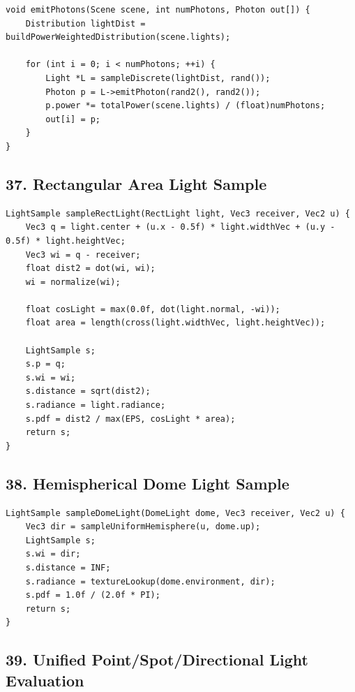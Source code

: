 \documentclass[10pt,letterpaper]{article}
\begin{document}
\begin{verbatim}
void emitPhotons(Scene scene, int numPhotons, Photon out[]) {
    Distribution lightDist = buildPowerWeightedDistribution(scene.lights);

    for (int i = 0; i < numPhotons; ++i) {
        Light *L = sampleDiscrete(lightDist, rand());
        Photon p = L->emitPhoton(rand2(), rand2());
        p.power *= totalPower(scene.lights) / (float)numPhotons;
        out[i] = p;
    }
}
\end{verbatim}

\subsection{37. Rectangular Area Light Sample}

\begin{verbatim}
LightSample sampleRectLight(RectLight light, Vec3 receiver, Vec2 u) {
    Vec3 q = light.center + (u.x - 0.5f) * light.widthVec + (u.y - 0.5f) * light.heightVec;
    Vec3 wi = q - receiver;
    float dist2 = dot(wi, wi);
    wi = normalize(wi);

    float cosLight = max(0.0f, dot(light.normal, -wi));
    float area = length(cross(light.widthVec, light.heightVec));

    LightSample s;
    s.p = q;
    s.wi = wi;
    s.distance = sqrt(dist2);
    s.radiance = light.radiance;
    s.pdf = dist2 / max(EPS, cosLight * area);
    return s;
}
\end{verbatim}

\subsection{38. Hemispherical Dome Light Sample}

\begin{verbatim}
LightSample sampleDomeLight(DomeLight dome, Vec3 receiver, Vec2 u) {
    Vec3 dir = sampleUniformHemisphere(u, dome.up);
    LightSample s;
    s.wi = dir;
    s.distance = INF;
    s.radiance = textureLookup(dome.environment, dir);
    s.pdf = 1.0f / (2.0f * PI);
    return s;
}
\end{verbatim}

\subsection{39. Unified Point/Spot/Directional Light Evaluation}
\end{document}
